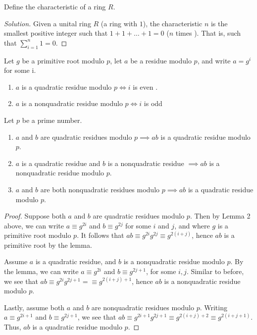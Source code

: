 \documentclass[11pt]{article}
\begin{document}
\begin{exercise}{12}
Define the characteristic of a ring $ R $.
\end{exercise}

\begin{proof}[Solution]
Given a unital ring $ R $ (a ring with $ 1 $), the characteristic $ n $ is the smallest positive integer such that $ 1 + 1 + \dots + 1 = 0 $ ($ n $ times ). That is, such that
$ \sum_{i = 1}^{n} 1 = 0$.
\end{proof}

\begin{lemma}{2}
Let $ g $ be a primitive root modulo $ p $, let $ a  $ be a residue modulo $ p $, and write $ a = g^{i} $ for some i.
\begin{enumerate}
\item $ a $ is a quadratic residue modulo $ p \iff i $ is even .
\item $ a $ is a nonquadratic residue modulo $ p \iff i $ is odd
\end{enumerate}
\end{lemma}

\begin{exercise}{13}
Let $ p $ be a prime number.
\begin{enumerate}
\item $ a $ and $ b $ are quadratic residues modulo $ p \implies ab $ is a quadratic residue modulo $ p $.
\item $ a $ is a quadratic residue and $ b $ is a nonquadratic residue $ \implies ab $ is a nonquadratic residue modulo $ p $.
\item $ a $ and $ b $ are both nonquadratic residues modulo $ p \implies ab $ is a quadratic residue modulo $ p $.
\end{enumerate}
\end{exercise}

\begin{proof}
 Suppose both $ a $ and $ b $ are quadratic residues modulo $ p $. Then by Lemma 2 above, we can write $ a \equiv g^{2i} $ and $ b \equiv g^{2j} $ for some $ i $ and $ j $, and where $ g $ is a primitive root modulo $ p $. It follows that $ ab \equiv g^{2i} g^{2j} \equiv g^{2(i + j)} $, hence $ ab $ is a primitive root by the lemma.

 Assume $ a $ is a quadratic residue, and $ b $ is a nonquadratic residue modulo $ p $. By the lemma, we can write $ a \equiv g^{2i} $ and $ b \equiv g^{2j+1} $, for some $ i, j $. Similar to before, we see that $ ab \equiv g^{2i} g^{2j+1} =\equiv g^{2(i + j) + 1} $, hence $ ab $ is a nonquadratic residue modulo $ p $.

 Lastly, assume both $ a $ and $ b $ are nonquadratic residues modulo $ p $. Writing $ a \equiv g^{2i+1} $ and $ b \equiv g^{2j+1} $, we see that $ ab \equiv g^{2i+1} g^{2j+1} \equiv g^{2(i + j) + 2} \equiv g^{2(i + j + 1)} $. Thus, $ ab $ is a quadratic residue modulo $ p $.
\end{proof}
\end{document}

